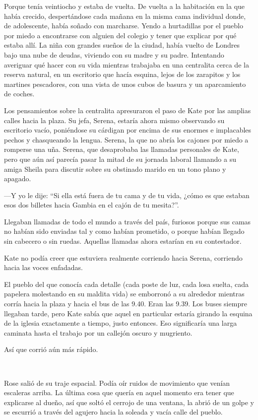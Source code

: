 Porque tenía veintiocho y estaba de vuelta. De vuelta a la habitación en
la que había crecido, despertándose cada mañana en la misma cama
individual donde, de adolescente, había soñado con marcharse. Yendo a
hurtadillas por el pueblo por miedo a encontrarse con alguien del
colegio y tener que explicar por qué estaba allí. La niña con grandes
sueños de la ciudad, había vuelto de Londres bajo una nube de deudas,
viviendo con su madre y su padre. Intentando averiguar qué hacer con su
vida mientras trabajaba en una centralita cerca de la reserva natural,
en un escritorio que hacía esquina, lejos de los zarapitos y los
martines pescadores, con una vista de unos cubos de basura y un
aparcamiento de coches.

Los pensamientos sobre la centralita apresuraron el paso de Kate por las
amplias calles hacia la plaza. Su jefa, Serena, estaría ahora mismo
observando su escritorio vacío, poniéndose su cárdigan por encima de sus
enormes e implacables pechos y chasqueando la lengua. Serena, la que no
abría los cajones por miedo a romperse una uña. Serena, que desaprobaba
las llamadas personales de Kate, pero que aún así parecía pasar la mitad
de su jornada laboral llamando a su amiga Sheila para discutir sobre su
obstinado marido en un tono plano y apagado.

---Y yo le dije: ``Si ella está fuera de tu cama y de tu vida, ¿cómo es
que estaban esos dos billetes hacia Gambia en el cajón de tu mesita?''.

Llegaban llamadas de todo el mundo a través del país, furiosos porque
sus camas no habían sido enviadas tal y como habían prometido, o porque
habían llegado sin cabecero o sin ruedas. Aquellas llamadas ahora
estarían en su contestador.

Kate no podía creer que estuviera realmente corriendo hacia Serena,
corriendo hacia las voces enfadadas.

El pueblo del que conocía cada detalle (cada poste de luz, cada losa
suelta, cada papelera molestando en su maldita vida) se emborronó a su
alrededor mientras corría hacia la plaza y hacia el bus de las 9.40.
Eran las 9.39. Los buses siempre llegaban tarde, pero Kate sabía que
aquel en particular estaría girando la esquina de la iglesia exactamente
a tiempo, justo entonces. Eso significaría una larga caminata hasta el
trabajo por un callejón oscuro y mugriento.

Así que corrió aún más rápido.

~

Rose salió de su traje espacial. Podía oír ruidos de movimiento que
venían escaleras arriba. La última cosa que quería en aquel momento era
tener que explicarse al dueño, así que soltó el cerrojo de una ventana,
la abrió de un golpe y se escurrió a través del agujero hacia la soleada
y vacía calle del pueblo.

